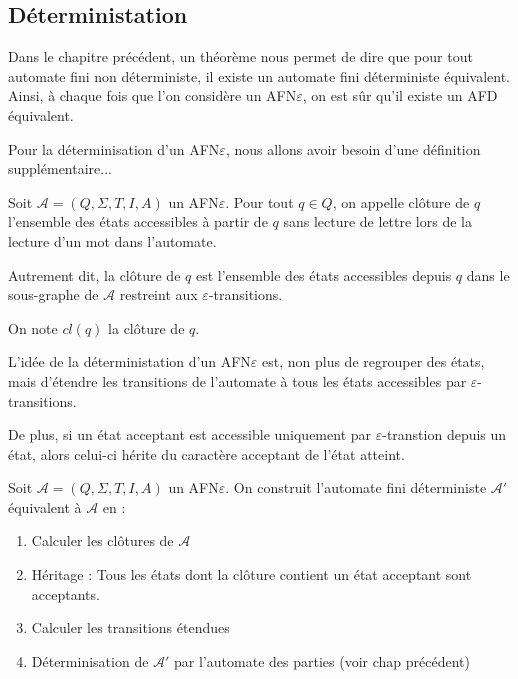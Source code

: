 \subsection{Déterministation}

Dans le chapitre précédent, un théorème nous permet de dire que pour tout automate fini non déterministe, 
il existe un automate fini déterministe équivalent. Ainsi, à chaque fois que l'on considère un AFN$\varepsilon$, 
on est sûr qu'il existe un AFD équivalent. 

Pour la déterminisation d'un AFN$\varepsilon$, nous allons avoir besoin d'une définition supplémentaire... 

\begin{definition}[Clôture]
    Soit $\mathcal{A} = (Q,\Sigma, T, I, A)$ un AFN$\varepsilon$. 
    Pour tout $q \in Q$, on appelle clôture de $q$ l'ensemble des états accessibles à partir de $q$ sans lecture de 
    lettre lors de la lecture d'un mot dans l'automate. 

    Autrement dit, la clôture de $q$ est l'ensemble des états accessibles depuis $q$ dans le sous-graphe de $ \mathcal{A}$
    restreint aux $\varepsilon$-transitions. 
    
    On note $cl(q)$ la clôture de $q$. 
\end{definition}


L'idée de la déterministation d'un AFN$\varepsilon$ est, non plus de regrouper des états, mais d'étendre les transitions 
de l'automate à tous les états accessibles par $\varepsilon$-transitions. 

De plus, si un état acceptant est accessible uniquement par $\varepsilon$-transtion depuis un état, alors celui-ci 
hérite du caractère acceptant de l'état atteint. 

\begin{proposition}
    Soit $\mathcal{A} = (Q,\Sigma, T, I, A)$ un AFN$\varepsilon$. On construit l'automate fini déterministe $ \mathcal{A}'$ 
    équivalent à $ \mathcal{A}$ en :
    \begin{enumerate}
        \item Calculer les clôtures de $ \mathcal{A}$ 
        \item Héritage : Tous les états dont la clôture contient un état acceptant sont acceptants. 
        \item Calculer les transitions étendues 
        \item Déterminisation de $ \mathcal{A'}$ par l'automate des parties (voir chap précédent)
    \end{enumerate}
\end{proposition}

